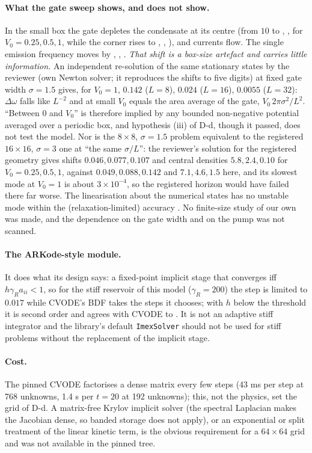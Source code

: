 \paragraph{What the gate sweep shows, and does not show.} In the small box the gate depletes the condensate at its centre
(from $10$ to \DdCentreA{}, \DdCentreB{}, \DdCentreC{} for $V_0=0.25,0.5,1$, while the corner rises to \DdCornerA{}, \DdCornerB{},
\DdCornerC{}), and currents flow. The single emission frequency moves by \DdShiftA{}, \DdShiftB{}, \DdShiftC{}.
\emph{That shift is a box-size artefact and carries little information.} An independent re-solution of the same stationary states by the
reviewer (own Newton solver; it reproduces the shifts to five digits) at fixed gate width $\sigma=1.5$ gives, for $V_0=1$,
$0.142$ ($L=8$), $0.024$ ($L=16$), $0.0055$ ($L=32$): $\Delta\omega$ falls like $L^{-2}$ and at small $V_0$ equals the area average
of the gate, $V_0\,2\pi\sigma^2/L^2$. ``Between $0$ and $V_0$'' is therefore implied by any bounded non-negative potential averaged
over a periodic box, and hypothesis (iii) of D-d, though it passed, does not test the model. Nor is the $8\times8$, $\sigma=1.5$
problem equivalent to the registered $16\times16$, $\sigma=3$ one at ``the same $\sigma/L$'': the reviewer's solution for the registered
geometry gives shifts $0.046,0.077,0.107$ and central densities $5.8,2.4,0.10$ for $V_0=0.25,0.5,1$, against $0.049,0.088,0.142$ and
$7.1,4.6,1.5$ here, and its slowest mode at $V_0=1$ is about $3\times10^{-4}$, so the registered horizon would have failed there far
worse. The linearisation about the numerical states has no unstable mode within the (relaxation-limited) accuracy \DdMaxReLambda{}.
No finite-size study of our own was made, and the dependence on the gate width and on the pump was not scanned.

\paragraph{The ARKode-style module.} It does what its design says: a fixed-point implicit stage that converges iff
$h\gamma_Ra_{ii}<1$, so for the stiff reservoir of this model ($\gamma_R=200$) the step is limited to $0.017$ while CVODE's BDF
takes the steps it chooses; with $h$ below the threshold it is second order and agrees with CVODE to \DeTraj{}. It is not
an adaptive stiff integrator and the library's default \texttt{ImexSolver} should not be used for stiff problems without the
replacement of the implicit stage.

\paragraph{Cost.} The pinned CVODE factorises a dense matrix every few steps (43 ms per step at 768 unknowns, 1.4 s per
$t=20$ at 192 unknowns); this, not the physics, set the grid of D-d. A matrix-free Krylov implicit solver (the spectral Laplacian makes the Jacobian dense, so banded storage does not apply), or an
exponential or split treatment of the linear kinetic term, is the obvious requirement for a $64\times64$ grid and was not
available in the pinned tree.
